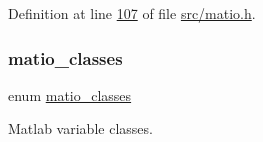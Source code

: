 Definition at line \hyperlink{src_2matio_8h_source_l00107}{107} of file \hyperlink{src_2matio_8h_source}{src/matio.\+h}.

\mbox{\label{group___m_a_t_gad4d60ae7b709fc81bfd744fb4c857c40}} 
\subsubsection{\texorpdfstring{matio\+\_\+classes}{matio\_classes}\hspace{0.1cm}{\footnotesize\ttfamily [2/2]}}
{\footnotesize\ttfamily enum \hyperlink{group___m_a_t_gad4d60ae7b709fc81bfd744fb4c857c40}{matio\+\_\+classes}}



Matlab variable classes. 

